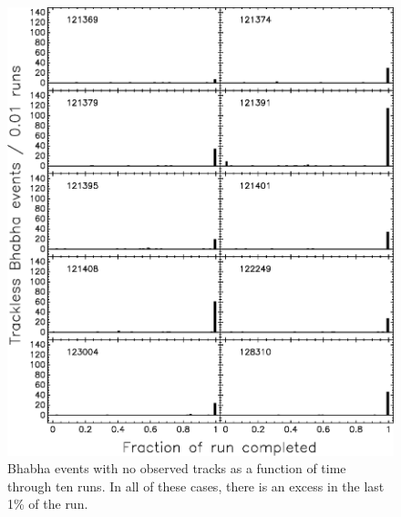 \documentclass{cornell}
\begin{document}
\begin{figure}[p]
  \begin{center}
    \includegraphics[width=0.95\linewidth]{crashruns2}
  \end{center}
  \caption[Ten runs in which the trackless Bhabha fraction increased
  at the end of the run]{\label{crashruns2} Bhabha events with no
  observed tracks as a function of time through ten runs.  In all of
  these cases, there is an excess in the last 1\% of the run.}
\end{figure}
\end{document}
